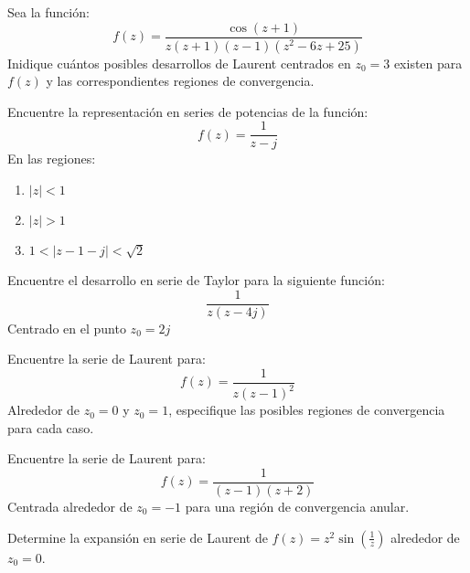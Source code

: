 \begin{ejercicio}
    Sea la función:
    $$ f(z)=\frac{\cos(z+1)}{z(z+1)(z-1)(z^2-6z+25)} $$
    Inidique cuántos posibles desarrollos de Laurent centrados en $z_0=3$ existen para $f(z)$ y las correspondientes regiones de convergencia.
\end{ejercicio}

\begin{ejercicio}
    Encuentre la representación en series de potencias de la función:
    $$ f(z)=\frac{1}{z-j} $$
    En las regiones:
    \begin{enumerate}
        \item $|z|<1$
        \item $|z|>1$
        \item $1<|z-1-j|<\sqrt{2}$
    \end{enumerate}
\end{ejercicio}

\begin{ejercicio}
    Encuentre el desarrollo en serie de Taylor para la siguiente función:
    $$ \frac{1}{z(z-4j)} $$
    Centrado en el punto $z_0=2j$
\end{ejercicio}

\begin{ejercicio}
    Encuentre la serie de Laurent para:
    $$ f(z)= \frac{1}{z(z-1)^2} $$
    Alrededor de $z_0=0$ y $z_0=1$, especifique las posibles regiones de convergencia para cada caso.
\end{ejercicio}

\begin{ejercicio}
    Encuentre la serie de Laurent para:
    $$ f(z) = \frac{1}{(z-1)(z+2)} $$
    Centrada alrededor de $z_0=-1$ para una región de convergencia anular.
\end{ejercicio}

\begin{ejercicio}
    Determine la expansión en serie de Laurent de $f(z)=z^2 \sin (\frac{1}{z})$ alrededor de $z_0=0$.
\end{ejercicio}

